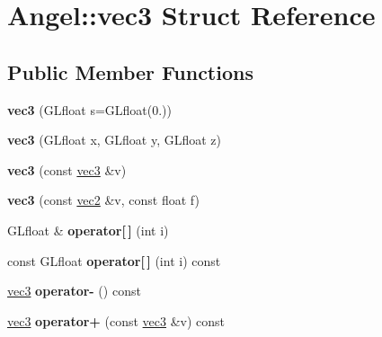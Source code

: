 \hypertarget{struct_angel_1_1vec3}{\section{Angel\-:\-:vec3 Struct Reference}
\label{struct_angel_1_1vec3}
}
\subsection*{Public Member Functions}
\begin{DoxyCompactItemize}
\item 
\hypertarget{struct_angel_1_1vec3_a420358f913d30a659761e3a86026cd59}{{\bfseries vec3} (G\-Lfloat s=G\-Lfloat(0.))}\label{struct_angel_1_1vec3_a420358f913d30a659761e3a86026cd59}

\item 
\hypertarget{struct_angel_1_1vec3_a9970b9133cd349d038456ae7309fbeba}{{\bfseries vec3} (G\-Lfloat x, G\-Lfloat y, G\-Lfloat z)}\label{struct_angel_1_1vec3_a9970b9133cd349d038456ae7309fbeba}

\item 
\hypertarget{struct_angel_1_1vec3_a3af0b92e9cb01f0cda2f66c007e196c9}{{\bfseries vec3} (const \hyperlink{struct_angel_1_1vec3}{vec3} \&v)}\label{struct_angel_1_1vec3_a3af0b92e9cb01f0cda2f66c007e196c9}

\item 
\hypertarget{struct_angel_1_1vec3_a597ff15b14f6bd9e75382525f6da00bd}{{\bfseries vec3} (const \hyperlink{struct_angel_1_1vec2}{vec2} \&v, const float f)}\label{struct_angel_1_1vec3_a597ff15b14f6bd9e75382525f6da00bd}

\item 
\hypertarget{struct_angel_1_1vec3_a571e36d7c9542eb3464b8fde016d040d}{G\-Lfloat \& {\bfseries operator\mbox{[}$\,$\mbox{]}} (int i)}\label{struct_angel_1_1vec3_a571e36d7c9542eb3464b8fde016d040d}

\item 
\hypertarget{struct_angel_1_1vec3_ad78e907775d490a69aa879a34e7dfe5c}{const G\-Lfloat {\bfseries operator\mbox{[}$\,$\mbox{]}} (int i) const }\label{struct_angel_1_1vec3_ad78e907775d490a69aa879a34e7dfe5c}

\item 
\hypertarget{struct_angel_1_1vec3_a5ec954ef19e3d1ceed6ce25ebe32c3ee}{\hyperlink{struct_angel_1_1vec3}{vec3} {\bfseries operator-\/} () const }\label{struct_angel_1_1vec3_a5ec954ef19e3d1ceed6ce25ebe32c3ee}

\item 
\hypertarget{struct_angel_1_1vec3_a320586bc86a5abd0ac991a3e51485ef6}{\hyperlink{struct_angel_1_1vec3}{vec3} {\bfseries operator+} (const \hyperlink{struct_angel_1_1vec3}{vec3} \&v) const }\label{struct_angel_1_1vec3_a320586bc86a5abd0ac991a3e51485ef6}


\end{DoxyCompactItemize}
